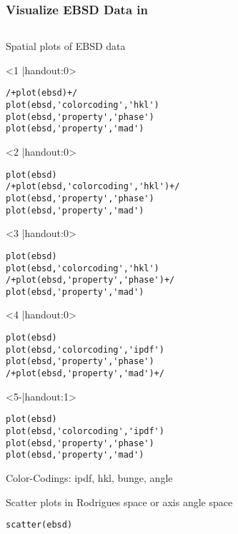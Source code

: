 \documentclass[compress]{beamer}
\begin{document}
\begin{frame}[fragile]
  \frametitle{Visualize EBSD Data in \MTEX}

  \begin{columns}
    \begin{column}{8.5cm}

Spatial plots of EBSD data
\begin{onlyenv}<1 |handout:0>
\begin{lstlisting}
/+plot(ebsd)+/
plot(ebsd,'colorcoding','hkl')
plot(ebsd,'property','phase')
plot(ebsd,'property','mad')
\end{lstlisting}
\end{onlyenv}
%
\begin{onlyenv}<2 |handout:0>
\begin{lstlisting}
plot(ebsd)
/+plot(ebsd,'colorcoding','hkl')+/
plot(ebsd,'property','phase')
plot(ebsd,'property','mad')
\end{lstlisting}
\end{onlyenv}
%
\begin{onlyenv}<3 |handout:0>
\begin{lstlisting}
plot(ebsd)
plot(ebsd,'colorcoding','hkl')
/+plot(ebsd,'property','phase')+/
plot(ebsd,'property','mad')
\end{lstlisting}
\end{onlyenv}
%
\begin{onlyenv}<4 |handout:0>
\begin{lstlisting}
plot(ebsd)
plot(ebsd,'colorcoding','ipdf')
plot(ebsd,'property','phase')
/+plot(ebsd,'property','mad')+/
\end{lstlisting}
\end{onlyenv}
%
\begin{onlyenv}<5-|handout:1>
\begin{lstlisting}
plot(ebsd)
plot(ebsd,'colorcoding','ipdf')
plot(ebsd,'property','phase')
plot(ebsd,'property','mad')
\end{lstlisting}
\end{onlyenv}

Color-Codings: ipdf, hkl, bunge, angle

\medskip

\pause
\pause
\pause
\pause

Scatter plots in Rodrigues space or axis angle space
\begin{lstlisting}
scatter(ebsd)
\end{lstlisting}

\medskip

\pause


\end{column}
\end{columns}
\end{frame}
\end{document}
